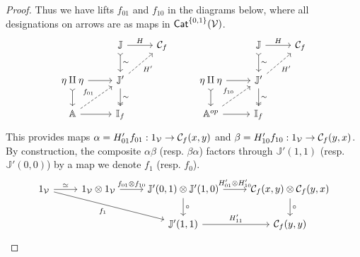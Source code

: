 \documentclass[a4paper,10pt
,draft
]{article}%
\newcommand{\I}{\mathbb I}
\newcommand{\J}{\mathbb J}
\renewcommand{\1}{\eta}%
\begin{document}
\begin{proof}
      Thus we have lifts $f_{01}$ and $f_{10}$ in the diagrams below,
      where all designations on arrows are as maps in $\mathsf{Cat}^{\left\{0,1\right\}}(\mathcal V)$.
      \begin{equation}
            \begin{tikzcd}
                  &
                  \J \arrow[r, "H"] \arrow[d, tail, "\sim"]
                  &
                  \mathcal C_f
                  &&
                  \J \arrow[r, "H"] \arrow[d, tail, "\sim"]
                  &
                  \mathcal C_f
                  \\
                  \1 \amalg \1 \arrow[r] \arrow[d, tail]
                  &
                  \J' \arrow[ur, dashed, "H'"'] \arrow[d, two heads, "\sim"]
                  &&
                  \1 \amalg \1 \arrow[r] \arrow[d, tail]
                  &
                  \J' \arrow[ur, dashed, "H'"'] \arrow[d, two heads, "\sim"]
                  \\
                  \mathbb A \arrow[r] \arrow[ur, dashed, "f_{01}"]
                  &
                  \I_f
                  &&
                  \mathbb A^{op} \arrow[r] \arrow[ur, dashed, "f_{10}"]
                  &
                  \I_f
            \end{tikzcd}
      \end{equation}
      This provides maps
      $\alpha = H'_{01} f_{01}: 1_{\mathcal V} \to \mathcal C_f(x,y)$
      and
      $\beta = H'_{10} f_{10}: 1_{\mathcal V} \to \mathcal C_f(y,x)$.
      By construction, the composite $\alpha\beta$ (resp. $\beta\alpha$) factors through $\J'(1,1)$ (resp. $\J'(0,0)$)
      by a map we denote $f_1$ (resp. $f_0$).
      \begin{equation}
            \begin{tikzcd}
                  1_\V \arrow[r, "\simeq"] \arrow[drr, "f_1"']
                  &
                  1_\V \otimes 1_\V \arrow[r, "f_{01} \otimes f_{10}"]
                  &
                  \J'(0,1) \otimes \J'(1,0) \arrow[d, "\circ"] \arrow[r, "H'_{01} \otimes H'_{10}"]
                  &
                  \mathcal C_f(x,y) \otimes \mathcal C_f(y,x) \arrow[d, "\circ"]
                  \\
                  &&
                  \J'(1,1) \arrow[r, "H'_{11}"]
                  &
                  \mathcal C_f(y,y)
            \end{tikzcd}
      \end{equation}
      

\end{proof}
\end{document}

